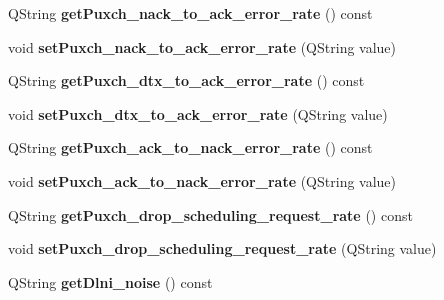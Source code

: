 \begin{DoxyCompactItemize}
\item 
Q\+String {\bfseries get\+Puxch\+\_\+nack\+\_\+to\+\_\+ack\+\_\+error\+\_\+rate} () const \hypertarget{class_channel_model_a9c4ced96f975c67b3c8a27840572964e}{}\label{class_channel_model_a9c4ced96f975c67b3c8a27840572964e}

\item 
void {\bfseries set\+Puxch\+\_\+nack\+\_\+to\+\_\+ack\+\_\+error\+\_\+rate} (Q\+String value)\hypertarget{class_channel_model_aec43edbca27f694cfd5f525da1281e1d}{}\label{class_channel_model_aec43edbca27f694cfd5f525da1281e1d}

\item 
Q\+String {\bfseries get\+Puxch\+\_\+dtx\+\_\+to\+\_\+ack\+\_\+error\+\_\+rate} () const \hypertarget{class_channel_model_af785f54eaa70665cab8613d7fecfc89d}{}\label{class_channel_model_af785f54eaa70665cab8613d7fecfc89d}

\item 
void {\bfseries set\+Puxch\+\_\+dtx\+\_\+to\+\_\+ack\+\_\+error\+\_\+rate} (Q\+String value)\hypertarget{class_channel_model_a4eb360104700d0849275ab97fa76384c}{}\label{class_channel_model_a4eb360104700d0849275ab97fa76384c}

\item 
Q\+String {\bfseries get\+Puxch\+\_\+ack\+\_\+to\+\_\+nack\+\_\+error\+\_\+rate} () const \hypertarget{class_channel_model_a1d5a76c3a6ec6ef1ada1ba6efd6b8081}{}\label{class_channel_model_a1d5a76c3a6ec6ef1ada1ba6efd6b8081}

\item 
void {\bfseries set\+Puxch\+\_\+ack\+\_\+to\+\_\+nack\+\_\+error\+\_\+rate} (Q\+String value)\hypertarget{class_channel_model_ae9db999dd8ea44d564a71ef891dacc74}{}\label{class_channel_model_ae9db999dd8ea44d564a71ef891dacc74}

\item 
Q\+String {\bfseries get\+Puxch\+\_\+drop\+\_\+scheduling\+\_\+request\+\_\+rate} () const \hypertarget{class_channel_model_a0963c6ee35179ce083add9483b611349}{}\label{class_channel_model_a0963c6ee35179ce083add9483b611349}

\item 
void {\bfseries set\+Puxch\+\_\+drop\+\_\+scheduling\+\_\+request\+\_\+rate} (Q\+String value)\hypertarget{class_channel_model_afeb784c70aa3fafd4c68377493ce1363}{}\label{class_channel_model_afeb784c70aa3fafd4c68377493ce1363}

\item 
Q\+String {\bfseries get\+Dlni\+\_\+noise} () const \hypertarget{class_channel_model_a67d6b3f5aa202208b36e88354343603f}{}\label{class_channel_model_a67d6b3f5aa202208b36e88354343603f}


\end{DoxyCompactItemize}
